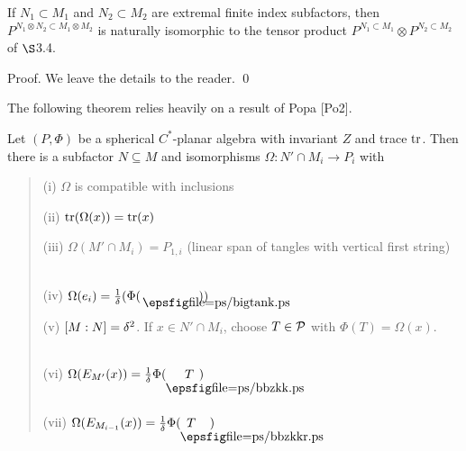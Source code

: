 \bigskip
{} If $N_1\subset M_1$ and
$N_2\subset M_2$ are extremal finite index subfactors, then
$P^{N_1\otimes N_2\subset M_1\otimes M_2}$ is naturally isomorphic
to the tensor product $P^{N_1\subset M_1}\otimes
P^{N_2\subset M_2}$ of $\S$3.4.

\bigskip
{\sc Proof.} We leave the details to the reader. \qed





\bs\bs{}

\smallskip
The following theorem relies heavily on a result of Popa [Po2].

\bigskip
{} Let $(P,\Phi)$ be a spherical $C^*$-planar
algebra with invariant $Z$ and trace ${\op{tr}}$. Then there is a
subfactor $N\subseteq M$ and isomorphisms $\Omega: N'\cap M_i\to
P_i$ with
\begin{verse}
(i) $\Omega$ is compatible with inclusions

(ii) ${\op{tr}}(\Omega(x))={\op{tr}}(x)$

(iii) $\Omega(M'\cap M_i)=P_{1,i}$
 (linear span of tangles with vertical first string)

(iv) $\Omega(e_i)=\frac{1}{\d}(\Phi(\bigtank ) )$

(v) $[M:N]=\d^2$. If $x\in N'\cap M_i$, choose $T\in\P$
with $\Phi(T)=\Omega(x)$.


(vi) $\Omega(E_{M'}(x))=\frac{1}{\d}\Phi (\boxk{T})$


(vii) $\Omega(E_{M_{i-1}}(x))=\frac{1}{\d}\Phi (\boxl{T})$
\end{verse}

